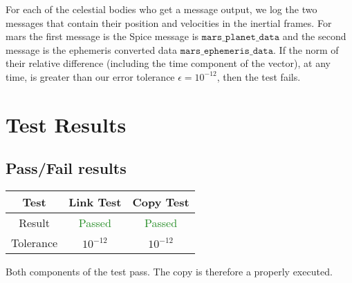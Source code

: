 For each of the celestial bodies who get a message output, we log the two messages that contain their position and velocities in the inertial frames. For mars the first message is the Spice message is $\texttt{mars$\_$planet$\_$data}$
and the second message is the ephemeris converted data $\texttt{mars$\_$ephemeris$\_$data}$. If the norm of their relative difference (including the time component of the vector), at any time, is greater than our error tolerance $\epsilon =10^{-12}$, then the test fails.

\section{Test Results}
\subsection{Pass/Fail results}

\begin{center}
	\begin{tabular}{c|c|c}
		Test & Link Test & Copy Test \\ \hline
		Result &  \textcolor{ForestGreen}{Passed} &  \textcolor{ForestGreen}{Passed} \\ \hline
		Tolerance & $10^{-12}$ & $10^{-12}$
	\end{tabular}
\end{center}

Both components of the test pass. The copy is therefore a properly executed.

